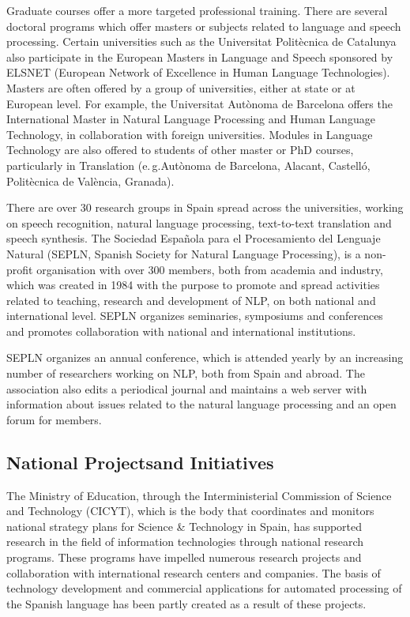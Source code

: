 \begin{multicols}{2}
Graduate courses offer a more targeted professional training. There are several doctoral programs which offer masters or subjects related to language and speech processing. Certain universities such as the Universitat Politècnica de Catalunya also participate in the European Masters in Language and Speech sponsored by ELSNET (European Network of Excellence in Human Language Technologies). Masters are often offered by a group of universities, either at state or at European level. For example, the Universitat Autònoma de Barcelona offers the International Master in Natural Language Processing and Human Language Technology, in collaboration with foreign universities. Modules in Language Technology are also offered to students of other master or PhD courses, particularly in Translation (e.\,g.Autònoma de Barcelona, Alacant, Castelló, Politècnica de València, Granada).


There are over 30 research groups in Spain spread across the universities, working on speech recognition, natural language processing, text-to-text translation and speech synthesis. The Sociedad Española para el Procesamiento del Lenguaje Natural (SEPLN, Spanish Society for Natural Language Processing), is a non-profit organisation with over 300 members, both from academia and industry, which was created in 1984 with the purpose to promote and spread activities related to teaching, research and development of NLP, on both national and international level. SEPLN organizes seminaries, symposiums and conferences and promotes collaboration with national and international institutions.

SEPLN organizes an annual conference, which is attended yearly by an increasing number of researchers working on NLP, both from Spain and abroad. The association also edits a periodical journal and maintains a web server with information about issues related to the natural language processing and an open forum for members. 

\subsection[National Projects and Initiatives]{National Projects\newline and Initiatives}

The Ministry of Education, through the Interministerial Commission of Science and Technology (CICYT), which is the body that coordinates and monitors national strategy plans for Science \& Technology in Spain, has supported research in the field of information technologies through national research programs. These programs have impelled numerous research projects and collaboration with international research centers and companies. The basis of technology development and commercial applications for automated processing of the Spanish language has been partly created as a result of these projects.


\end{multicols}

